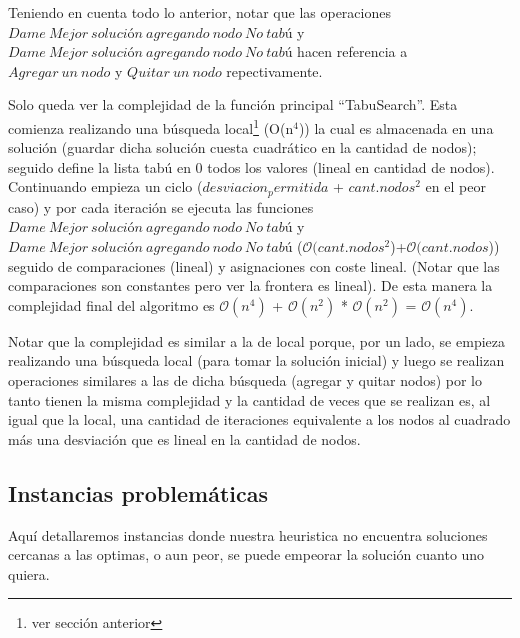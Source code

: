  Teniendo en cuenta todo lo anterior, notar que las operaciones $Dame\ Mejor\ solución\ agregando\ nodo\ No\ tabú$ y $Dame\ Mejor\ solución\ agregando\ nodo\ No\ tabú$ hacen referencia a $Agregar\ un\ nodo$ y $Quitar\ un\ nodo$ repectivamente.\newline

 Solo queda ver la complejidad de la función principal ``TabuSearch''. Esta comienza realizando una búsqueda local\footnote{ver sección anterior} (O(n$^{4}$)) la cual es almacenada en una solución (guardar dicha solución cuesta cuadrático en la cantidad de nodos); seguido define la lista tabú en 0 todos los valores (lineal en cantidad de nodos). Continuando empieza un ciclo ($desviacion_permitida$ + $cant.nodos^{2}$ en el peor caso) y por cada iteración se ejecuta las funciones $Dame\ Mejor\ solución\ agregando\ nodo\ No\ tabú$ y $Dame\ Mejor\ solución\ agregando\ nodo\ No\ tabú$ ($\mathcal{O}(cant.nodos^{2}$)+$\mathcal{O}(cant.nodos$)) seguido de comparaciones (lineal) y asignaciones con coste lineal. (Notar que las comparaciones son constantes pero ver la frontera es lineal). \newline
 De esta manera la complejidad final del algoritmo es $\mathcal{O}(n^{4})$ + $\mathcal{O}(n^{2})$ * $\mathcal{O}(n^{2})$ = $\mathcal{O}(n^{4})$.  \newline

Notar que la complejidad es similar a la de local porque, por un lado, se empieza realizando una búsqueda local (para tomar la solución inicial) y luego se realizan operaciones similares a las de dicha búsqueda (agregar y quitar nodos) por lo tanto tienen la misma complejidad y la cantidad de veces que se realizan es, al igual que la local, una cantidad de iteraciones equivalente a los nodos al cuadrado más una desviación que es lineal en la cantidad de nodos.


\subsection{Instancias problemáticas}

 Aquí detallaremos instancias donde nuestra heuristica no encuentra soluciones cercanas a las optimas, o aun peor, se puede empeorar la solución cuanto uno quiera.

